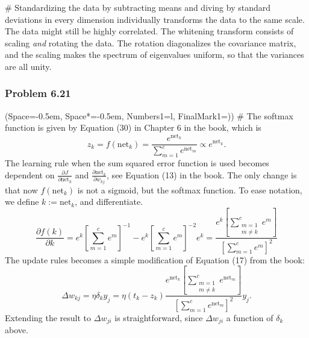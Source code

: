 \documentclass[12pt, a4paper]{article}
\newcommand{\listSpace}{-0.5em}%
\begin{document}
{\begin{easylist}[enumerate]
# Standardizing the data by subtracting means and diving by standard deviations in every dimension individually transforms the data to the same scale.
The data might still be highly correlated.
The whitening transform consists of scaling \emph{and} rotating the data.
The rotation diagonalizes the covariance matrix, and the scaling makes the spectrum of eigenvalues uniform, so that the variances are all unity.




\end{easylist}



\subsubsection*{Problem 6.21}
\begin{easylist}[enumerate]
\ListProperties(Space=\listSpace, Space*=\listSpace, Numbers1=l, FinalMark1={)})
# The softmax function is given by Equation (30) in Chapter 6 in the book, which is
\begin{equation*}
	z_k = f(\text{net}_k) = \frac{e^{\text{net}_k}}{\sum_{m=1}^{c} e^{\text{net}_m}} \propto e^{\text{net}_k}.
\end{equation*}
The learning rule when the sum squared error function is used becomes dependent on $\frac{\partial J}{\partial \text{net}_k}$ and $\frac{\partial \text{net}_k}{\partial w_{kj}}$, see Equation (13) in the book.
The only change is that now $f(\text{net}_k)$ is not a sigmoid, but the softmax function.
To ease notation, we define $k := \text{net}_k$, and differentiate.
\begin{equation*}
	\frac{\partial f(k)}{\partial k}
	=
	e^{k} \left[ \sum_{m=1}^{c} e^{m} \right]^{-1}
	-
	e^{k} \left[ \sum_{m=1}^{c} e^{m} \right]^{-2} e^{k}
	=
	\frac{e^{k} \left[ \sum_{\substack{m=1 \\ m \neq k}}^{c} e^{m} \right]}{\left[ \sum_{m=1}^{c} e^{m} \right]^2}
\end{equation*}
The update rules becomes a simple modification of Equation (17) from the book:
\begin{equation*}
	\Delta w_{kj} = \eta \delta_k y_j = \eta (t_k - z_k) 
	\frac{e^{\text{net}_k} \left[ \sum_{\substack{m=1 \\ m \neq k}}^{c} e^{\text{net}_m} \right]}{\left[ \sum_{m=1}^{c} e^{\text{net}_m} \right]^2}
	y_j.
\end{equation*}
Extending the result to $\Delta w_{ji}$ is straightforward, since $\Delta w_{ji}$ a function of $\delta_k$ above. 


\end{easylist}}
\end{document}
